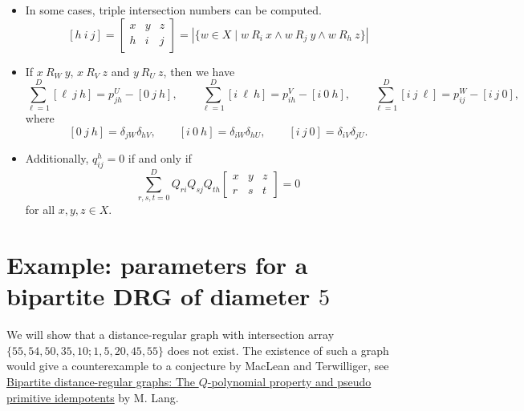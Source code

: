 \documentclass[11pt]{article}
\providecommand{\tightlist}{%
      \setlength{\itemsep}{0pt}\setlength{\parskip}{0pt}}
\renewcommand{\textbf}[1]{\textcolor[rgb]{1,0,0}{{#1}}}
\renewcommand{\emph}[1]{\textcolor[rgb]{0,0,1}{{#1}}}
\renewcommand{\sout}[1]{\textcolor[rgb]{0,0.5,0}{{#1}}}
\begin{document}
\begin{itemize}
\tightlist
\item
  In some cases, \textbf{triple intersection numbers} can be computed.
  \textbf{\[
  [h \ i \ j] = \begin{bmatrix} x & y & z \\ h & i & j \end{bmatrix} = |\{w \in X \mid w \ R_i \ x \land w \ R_j \ y \land w \ R_h \ z\}|
  \]}
\item
  If \textbf{\(x \ R_W \ y\)}, \textbf{\(x \ R_V \ z\)} and
  \textbf{\(y \ R_U \ z\)}, then we have \emph{\[
  \sum_{\ell=1}^D [\ell\ j\ h] = p^U_{jh} - [0\ j\ h], \qquad
  \sum_{\ell=1}^D [i\ \ell\ h] = p^V_{ih} - [i\ 0\ h], \qquad
  \sum_{\ell=1}^D [i\ j\ \ell] = p^W_{ij} - [i\ j\ 0],
  \]} where \emph{\[
  [0\ j\ h] = \delta_{jW} \delta_{hV}, \qquad
  [i\ 0\ h] = \delta_{iW} \delta_{hU}, \qquad
  [i\ j\ 0] = \delta_{iV} \delta_{jU}.
  \]}
\item
  Additionally, \textbf{\(q^h_{ij} = 0\)} \sout{if and only if} \sout{\[
  \sum_{r,s,t=0}^D Q_{ri}Q_{sj}Q_{th} \begin{bmatrix} x & y & z \\ r & s & t \end{bmatrix} = 0
  \]} for \sout{all \(x, y, z \in X\)}.
\end{itemize}

\newpage

    \hypertarget{example-parameters-for-a-bipartite-drg-of-diameter-5}{%
\section*{\texorpdfstring{Example: parameters for a bipartite DRG of
diameter
\(5\)}{Example: parameters for a bipartite DRG of diameter 5}}\label{example-parameters-for-a-bipartite-drg-of-diameter-5}}

We will show that a distance-regular graph with intersection array
\textbf{\(\{55, 54, 50, 35, 10; 1, 5, 20, 45, 55\}\)} \sout{does not
exist}. The existence of such a graph would give a \emph{counterexample}
to a conjecture by MacLean and Terwilliger, see
\href{http://dx.doi.org/10.1016/j.disc.2014.04.025}{Bipartite
distance-regular graphs: The \(Q\)-polynomial property and pseudo
primitive idempotents} by M. Lang.
\end{document}
